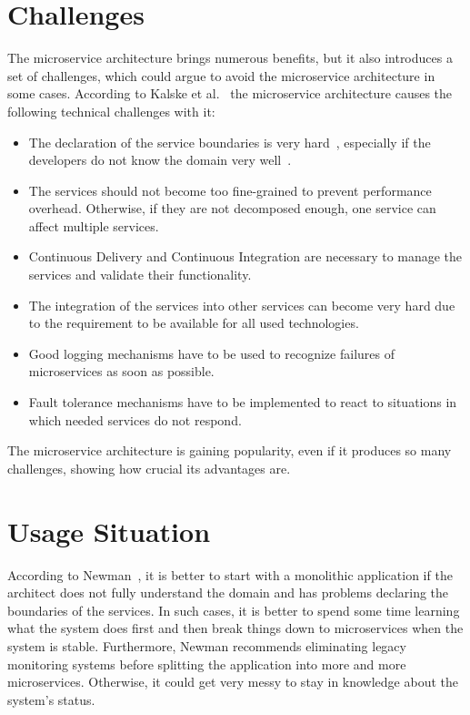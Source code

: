 \section{Challenges} \label{sec:microservice_challenges}
The microservice architecture brings numerous benefits, but it also introduces a set of challenges, which could argue to avoid the microservice architecture in some cases.
According to Kalske et al.~\cite{kalske2017challenges} the microservice architecture causes the following technical challenges with it: 
\begin{itemize}
    \item The declaration of the service boundaries is very hard~\cite{kalske2017challenges}, especially if the developers do not know the domain very well~\cite{newman2021building}.
    \item The services should not become too fine-grained to prevent performance overhead.
		Otherwise, if they are not decomposed enough, one service can affect multiple services.
    \item Continuous Delivery and Continuous Integration are necessary to manage the services and validate their functionality.
    \item The integration of the services into other services can become very hard due to the requirement to be available for all used technologies.
    \item Good logging mechanisms have to be used to recognize failures of microservices as soon as possible.
    \item Fault tolerance mechanisms have to be implemented to react to situations in which needed services do not respond.
\end{itemize}
The microservice architecture is gaining popularity, even if it produces so many challenges, showing how crucial its advantages are.

\section{Usage Situation}
According to Newman~\cite{newman2021building}, it is better to start with a monolithic application if the architect does not fully understand the domain and has problems declaring the boundaries of the services.
In such cases, it is better to spend some time learning what the system does first and then break things down to microservices when the system is stable.
Furthermore, Newman recommends eliminating legacy monitoring systems before splitting the application into more and more microservices.
Otherwise, it could get very messy to stay in knowledge about the system's status.

